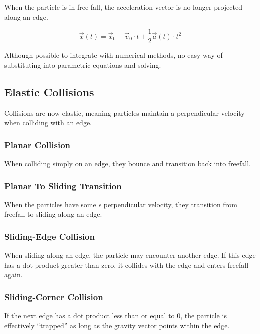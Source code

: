 When the particle is in free-fall, the acceleration vector is no longer projected along an edge.

$$
\vec{x}(t) = \vec{x}_0 + \vec{v}_{0} \cdot t + \frac{1}{2}\vec{a}(t)  \cdot t^2
$$

Although possible to integrate with numerical methods, no easy way of substituting into parametric equations and solving.


	\subsection{Elastic Collisions}

	Collisions are now elastic, meaning particles maintain a perpendicular velocity when colliding with an edge.

		\subsubsection{Planar Collision}

		When colliding simply on an edge, they bounce and transition back into freefall.


		\subsubsection{Planar To Sliding Transition}

		When the particles have some $\epsilon$ perpendicular velocity, they transition from freefall to sliding along an edge.


		\subsubsection{Sliding-Edge Collision}

		When sliding along an edge, the particle may encounter another edge. If this edge has a dot product greater than zero, it collides with the edge and enters freefall again.


		\subsubsection{Sliding-Corner Collision}

		If the next edge has a dot product less than or equal to 0, the particle is effectively ``trapped'' as long as the gravity vector points within the edge.

